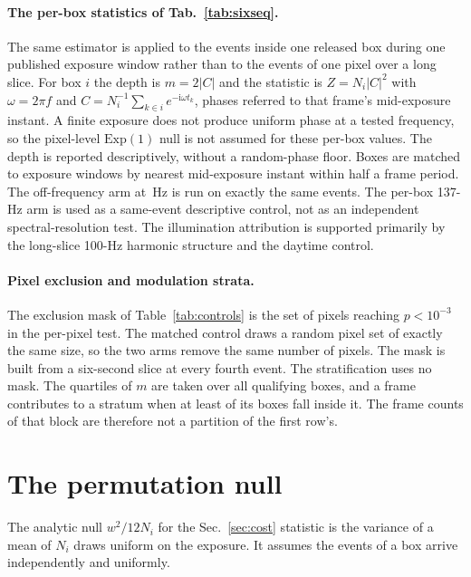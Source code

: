 \documentclass[10pt,twocolumn,letterpaper]{article}
\begin{document}
\paragraph{The per-box statistics of Tab.~\ref{tab:sixseq}.} The same estimator is applied
to the events inside one released box during one published exposure window rather
than to the events of one pixel over a long slice. For box $i$ the depth is
$m=2|C|$ and the statistic is $Z=N_{i}|C|^{2}$ with
$\omega=2\pi f$ and $C=N_{i}^{-1}\sum_{k\in i}e^{-\mathrm{i}\omega t_{k}}$, phases referred to that
frame's mid-exposure instant. A finite exposure does not produce uniform phase
at a tested frequency, so the pixel-level $\mathrm{Exp}(1)$ null is not assumed
for these per-box values. The depth is reported descriptively, without a
random-phase floor. Boxes are matched to exposure windows by nearest mid-exposure
instant within half a frame period. The off-frequency arm at
\flickerCtrlHz\,Hz is run on exactly the same events. The per-box 137-Hz arm is used as a
same-event descriptive control, not as an independent spectral-resolution test. The
illumination attribution is supported primarily by the long-slice 100-Hz harmonic structure
and the daytime control.

\paragraph{Pixel exclusion and modulation strata.} The exclusion mask of
Table~\ref{tab:controls} is the set of pixels reaching $p<10^{-3}$ in the
per-pixel test. The
matched control draws a random pixel set of exactly the same size, so the two
arms remove the same number of pixels. The mask is built from a six-second slice
at every fourth event. The stratification uses no mask. The quartiles of $m$ are
taken over all \modBoxes{} qualifying boxes, and a frame contributes to a stratum
when at least \minObjects{} of its boxes fall inside it. The frame
counts of that block are therefore not a partition of the first row's.

\section{The permutation null}
\label{sup:perm}

The analytic null $w^{2}/12N_{i}$ for the Sec.~\ref{sec:cost} statistic is the variance of a mean of
$N_{i}$ draws uniform on the exposure. It assumes the events of a box arrive
independently and uniformly.
\end{document}
